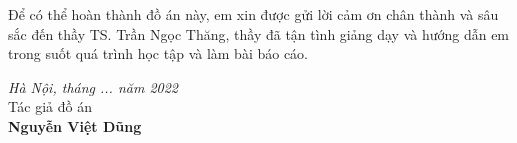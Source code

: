 \documentclass[oneside, a4paper]{book}
\theoremstyle{plain}
\theoremstyle{definition}
\theoremstyle{remark}
\begin{document}
Để có thể hoàn thành đồ án này, em xin được gửi lời cảm ơn chân thành và
sâu sắc đến thầy TS. Trần Ngọc Thăng, thầy đã tận tình giảng dạy và hướng dẫn em trong suốt quá trình học tập và làm bài báo cáo.



\begin{minipage}{0.5\textwidth}
\end{minipage}
\hspace{0.5\textwidth}
\begin{minipage}{0.5\textwidth}
	\noindent\begin{center}
		\vspace{1cm}
		\textit{Hà Nội, tháng ... năm 2022} \\
		Tác giả đồ án\\ \vspace{1cm}
		\textbf{Nguyễn Việt Dũng}
	\end{center}	
\end{minipage}

\bigskip




\tableofcontents %


\newpage




\setcounter{page}{1}


\end{document}
